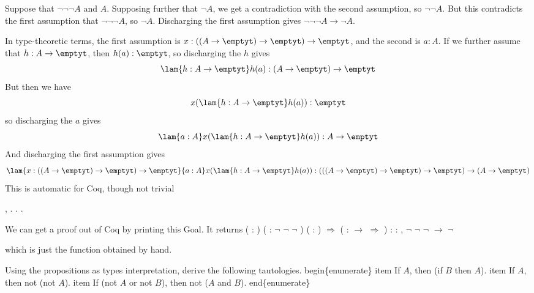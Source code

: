 \soln 
Suppose that $\lnot\lnot\lnot A$ and $A$.  Supposing further that $\lnot
A$, we get a contradiction with the second assumption, so $\lnot \lnot A$.  But
this contradicts the first assumption that $\lnot\lnot\lnot A$, so $\lnot A$.
Discharging the first assumption gives $\lnot\lnot\lnot A \to \lnot A$.


In type-theoretic terms, the first assumption is $x : ((A \to \emptyt) \to
\emptyt) \to \emptyt$, and the second is $a : A$.  If we further assume that
$h : A \to \emptyt$, then $h(a) : \emptyt$, so discharging the $h$ gives
\[
  \lam{h:A \to \emptyt}h(a) : (A \to \emptyt) \to \emptyt
\]
But then we have
\[
  x(\lam{h : A \to \emptyt}h(a)) : \emptyt
\]
so discharging the $a$ gives
\[
  \lam{a:A}x(\lam{h : A \to \emptyt}h(a)) : A \to \emptyt
\]
And discharging the first assumption gives
\[
  \lam{x:((A\to\emptyt)\to\emptyt)\to\emptyt}{a:A}x(\lam{h : A \to
    \emptyt}h(a)) :
  (((A \to \emptyt) \to \emptyt) \to \emptyt) \to (A \to \emptyt)
\]
This is automatic for Coq, though not trivial \begin{coqdoccode}
\coqdocemptyline
\coqdocnoindent
{} \coqdockw{\ensuremath{\forall}} , \coqdocnotation{\ensuremath{\lnot}} \coqdocnotation{\ensuremath{\lnot}} \coqdocnotation{\ensuremath{\lnot}}   \coqdocnotation{\ensuremath{\lnot}}. . .\coqdoceol
\coqdocemptyline
\end{coqdoccode}


\noindent 
We can get a proof out of Coq by printing this
Goal.  It returns
\coqdoceol
\coqdocemptyline
\coqdocnoindent
{} ( : ) ( : \ensuremath{\lnot} \ensuremath{\lnot} \ensuremath{\lnot} ) ( : ) \ensuremath{\Rightarrow}  (  :  \ensuremath{\rightarrow}  \ensuremath{\Rightarrow}  ) \coqdoceol
\coqdocnoindent
: \coqdockw{\ensuremath{\forall}}  : , \ensuremath{\lnot} \ensuremath{\lnot} \ensuremath{\lnot}  \ensuremath{\rightarrow} \ensuremath{\lnot} 

\coqdocemptyline
which is just the function obtained by hand.


Using the propositions as types interpretation, derive the
following tautologies.
begin\{enumerate\}
  item If $A$, then (if $B$ then $A$).
  item If $A$, then not (not $A$).
  item If (not $A$ or not $B$), then not ($A$ and $B$).
end\{enumerate\} \begin{coqdoccode}
\coqdocemptyline
\end{coqdoccode}


